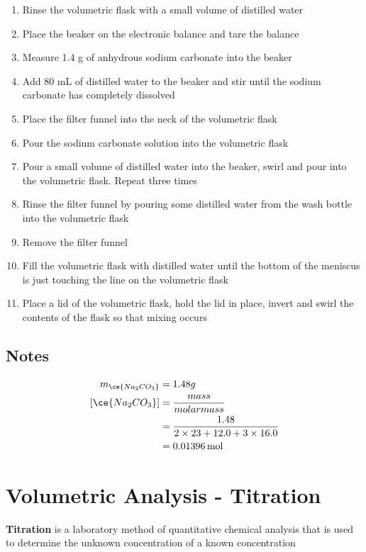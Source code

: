 		\begin{enumerate}
			\item Rinse the volumetric flask with a small volume of distilled water
			\item Place the beaker on the electronic balance and tare the balance
			\item Measure 1.4 g of anhydrous sodium carbonate into the beaker
			\item Add 80 mL of distilled water to the beaker and stir until the sodium carbonate has completely dissolved
			\item Place the filter funnel into the neck of the volumetric flask
			\item Pour the sodium carbonate solution into the volumetric flask
			\item Pour a small volume of distilled water into the beaker, swirl and pour into the volumetric flask. Repeat three times
			\item Rinse the filter funnel by pouring some distilled water from the wash bottle into the volumetric flask
			\item Remove the filter funnel
			\item Fill the volumetric flask with distilled water until the bottom of the meniscus is just touching the line on the volumetric flask
			\item Place a lid of the volumetric flask, hold the lid in place, invert and swirl the contents of the flask so that mixing occurs
		\end{enumerate}

	\subsection{Notes}
	
		\begin{align*}
			m_{\ce{Na_2CO_3}} &= 1.48 g \\
			[\ce{Na_2CO_3}] &= \frac{mass}{molar mass} \\
			&= \frac{1.48}{2 \times 23 + 12.0 + 3 \times 16.0} \\
			&= 0.01396 \, \text{mol}
		\end{align*}


\section{Volumetric Analysis - Titration}

	\textbf{Titration} is a laboratory method of quantitative chemical analysis that is used to determine the unknown concentration of a known concentration

